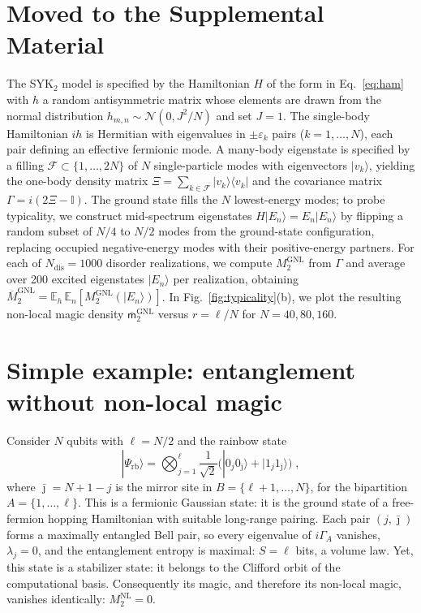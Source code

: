 \documentclass[aps,prl,twocolumn,superscriptaddress,reprint,longbibliography,nofootinbib]{revtex4-2}
\begin{document}
\clearpage
\section*{Moved to the Supplemental Material}

The SYK$_2$ model is specified by the Hamiltonian  $H$ of the form in  Eq.~\eqref{eq:ham} with  $h$ a random antisymmetric matrix whose elements are drawn from the normal distribution $h_{m,n}\sim \mathcal{N}(0,{J^2}/{N})$ and set $J=1$. 
The single-body Hamiltonian $ih$ is Hermitian with eigenvalues in $\pm\varepsilon_k$ pairs ($k=1,\dots,N$), each pair defining an effective fermionic mode. A many-body eigenstate is specified by a filling $\mathcal{F}\subset\{1,\dots,2N\}$ of $N$ single-particle modes with eigenvectors $|v_k\rangle$, yielding the one-body density matrix $\Xi=\sum_{k\in\mathcal{F}}|v_k\rangle\langle v_k|$ and the covariance matrix $\Gamma = i(2\Xi-\mathbb{I})$. 
The ground state fills the $N$ lowest-energy modes; to probe typicality, we construct mid-spectrum eigenstates $H|E_n\rangle=E_n|E_n\rangle$  by flipping a random subset of $N/4$ to $N/2$ modes from the ground-state configuration, replacing occupied negative-energy modes with their positive-energy partners. For each of $N_{\mathrm{dis}}=1000$ disorder realizations, we compute $M_2^{\mathrm{GNL}}$ from $\Gamma$ and average over 200 excited eigenstates $|E_n\rangle$ per realization, obtaining $\overline{M}_2^{\mathrm{GNL}}=\mathbb{E}_{h}\,\mathbb{E}_{n}[M_2^{\mathrm{GNL}}(|E_n\rangle)]$.
In Fig.~\ref{fig:typicality}(b), we plot the resulting non-local magic density $\overline{\mathsf{m}}_2^\mathrm{GNL}$ versus $r=\ell/N$ for $N=40,80,160$.

\section{Simple example: entanglement without non-local magic}
\label{app:rainbow}
Consider $N$ qubits with $\ell = N/2$ and the rainbow state
\begin{equation}
    |\Psi_{\mathrm{rb}}\rangle = \bigotimes_{j=1}^{\ell} \frac{1}{\sqrt{2}}\bigl(|0_j 0_{\bar\jmath}\rangle + |1_j 1_{\bar\jmath}\rangle\bigr)\;,
\end{equation}
where $\bar\jmath = N+1-j$ is the mirror site in $B=\{\ell+1,\dots,N\}$, for the bipartition $A=\{1,\dots,\ell\}$. This is a fermionic Gaussian state: it is the ground state of a free-fermion hopping Hamiltonian with suitable long-range pairing. Each pair $(j,\bar\jmath)$ forms a maximally entangled Bell pair, so every eigenvalue of $i\Gamma_A$ vanishes, $\lambda_j = 0$, and the entanglement entropy is maximal: $S = \ell$ bits, a volume law. Yet, this state is a stabilizer state: it belongs to the Clifford orbit of the computational basis. Consequently its magic, and therefore its non-local magic, vanishes identically: $M_2^{\mathrm{NL}} = 0$.
\end{document}

